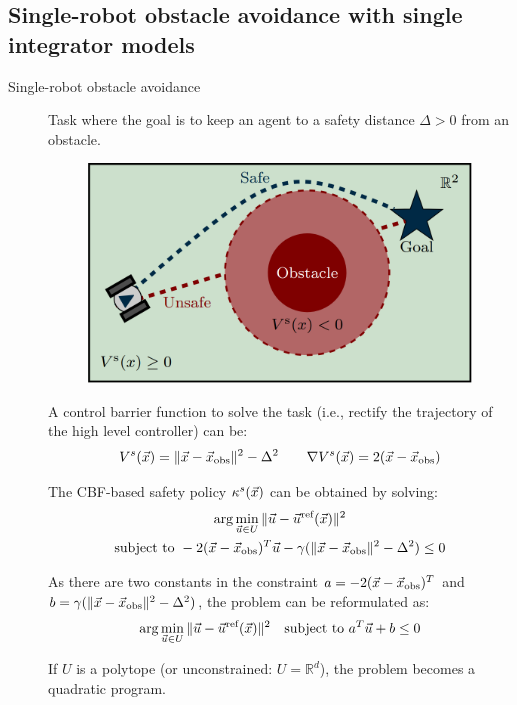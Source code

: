 \subsection{Single-robot obstacle avoidance with single integrator models}

\begin{description}
    \item[Single-robot obstacle avoidance]  
        Task where the goal is to keep an agent to a safety distance $\Delta > 0$ from an obstacle.

        \begin{figure}[H]
            \centering
            \includegraphics[width=0.35\linewidth]{./img/safety_control_single.png}
        \end{figure}

        A control barrier function to solve the task (i.e., rectify the trajectory of the high level controller) can be:
        \[
            V^s({\vec{x}}) = \Vert {\vec{x}} - {\vec{x}}_\text{obs} \Vert^2 - \Delta^2
            \qquad
            \nabla V^s({\vec{x}}) = 2({\vec{x}} - {\vec{x}}_\text{obs})
        \]

        The CBF-based safety policy $\kappa^s({\vec{x}})$ can be obtained by solving:
        \[
            \begin{gathered}
                \arg\min_{{\vec{u}} \in U} \Vert {\vec{u}} - {\vec{u}}^\text{ref}({\vec{x}}) \Vert^2 \\
                \text{subject to } -2({\vec{x}}-{\vec{x}}_\text{obs})^T {\vec{u}} - \gamma(\Vert {\vec{x}}-{\vec{x}}_\text{obs} \Vert^2 - \Delta^2) \leq 0
            \end{gathered}
        \]

        As there are two constants in the constraint $a = -2({\vec{x}}-{\vec{x}}_\text{obs})^T$ and $b = \gamma(\Vert {\vec{x}}-{\vec{x}}_\text{obs} \Vert^2 - \Delta^2)$, the problem can be reformulated as:
        \[
            \arg\min_{{\vec{u}} \in U} \Vert {\vec{u}} - {\vec{u}}^\text{ref}({\vec{x}}) \Vert^2 \quad \text{subject to } a^T {\vec{u}} + b \leq 0
        \]
        
        \begin{remark}
            If $U$ is a polytope (or unconstrained: $U = \mathbb{R}^d$), the problem becomes a quadratic program.
        \end{remark}
\end{description}


